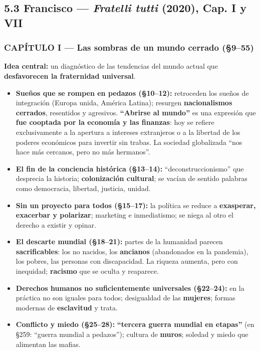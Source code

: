 \documentclass[10pt,a4paper]{article}
\begin{document}
\subsection{5.3 Francisco --- \textit{Fratelli tutti} (2020), Cap. I y VII}

\subsubsection{CAPÍTULO I --- Las sombras de un mundo cerrado (\S{}9--55)}

\noindent \textbf{Idea central:} un diagnóstico de las tendencias del mundo actual que \textbf{desfavorecen la fraternidad universal}.\par\smallskip

\begin{itemize}
\item \textbf{Sueños que se rompen en pedazos (\S{}10--12):} retroceden los sueños de integración (Europa unida, América Latina); resurgen \textbf{nacionalismos cerrados}, resentidos y agresivos. \textbf{``Abrirse al mundo''} es una expresión que \textbf{fue cooptada por la economía y las finanzas}: hoy se refiere exclusivamente a la apertura a intereses extranjeros o a la libertad de los poderes económicos para invertir sin trabas. La sociedad globalizada ``nos hace más cercanos, pero no más hermanos''.
\item \textbf{El fin de la conciencia histórica (\S{}13--14):} ``deconstruccionismo'' que desprecia la historia; \textbf{colonización cultural}; se vacían de sentido palabras como democracia, libertad, justicia, unidad.
\item \textbf{Sin un proyecto para todos (\S{}15--17):} la política se reduce a \textbf{exasperar, exacerbar y polarizar}; marketing e inmediatismo; se niega al otro el derecho a existir y opinar.
\item \textbf{El descarte mundial (\S{}18--21):} partes de la humanidad parecen \textbf{sacrificables}: los no nacidos, los \textbf{ancianos} (abandonados en la pandemia), los pobres, las personas con discapacidad. La riqueza aumenta, pero con inequidad; \textbf{racismo} que se oculta y reaparece.
\item \textbf{Derechos humanos no suficientemente universales (\S{}22--24):} en la práctica no son iguales para todos; desigualdad de las \textbf{mujeres}; formas modernas de \textbf{esclavitud} y trata.
\item \textbf{Conflicto y miedo (\S{}25--28):} \textbf{``tercera guerra mundial en etapas''} (en \S{}259: ``guerra mundial a pedazos''); cultura de \textbf{muros}; soledad y miedo que alimentan las mafias.

\end{itemize}
\end{document}
